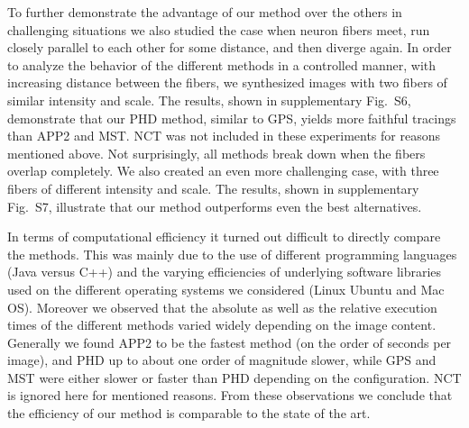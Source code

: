 

To further demonstrate the advantage of our method over the others in challenging situations we also studied the case when neuron fibers meet, run closely parallel to each other for some distance, and then diverge again. In order to analyze the behavior of the different methods in a controlled manner, with increasing distance between the fibers, we synthesized images with two fibers of similar intensity and scale. The results, shown in supplementary Fig.~S6, demonstrate that our PHD method, similar to GPS, yields more faithful tracings than APP2 and MST. NCT was not included in these experiments for reasons mentioned above. Not surprisingly, all methods break down when the fibers overlap completely. We also created an even more challenging case, with three fibers of different intensity and scale. The results, shown in supplementary Fig.~S7, illustrate that our method outperforms even the best alternatives.


In terms of computational efficiency it turned out difficult to directly compare the methods. This was mainly due to the use of different programming languages (Java versus C++) and the varying efficiencies of underlying software libraries used on the different operating systems we considered (Linux Ubuntu and Mac OS). Moreover we observed that the absolute as well as the relative execution times of the different methods varied widely depending on the image content. Generally we found APP2 to be the fastest method (on the order of seconds per image), and PHD up to about one order of magnitude slower, while GPS and MST were either slower or faster than PHD depending on the configuration. NCT is ignored here for mentioned reasons. From these observations we conclude that the efficiency of our method is comparable to the state of the art.

